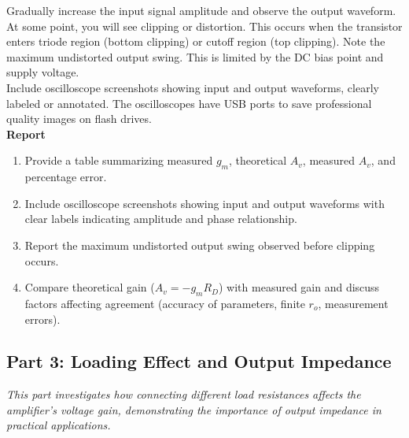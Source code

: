 \documentclass[10pt]{article}
\begin{document}
Gradually increase the input signal amplitude and observe the output waveform. At some point, you will see clipping or distortion. This occurs when the transistor enters triode region (bottom clipping) or cutoff region (top clipping). Note the maximum undistorted output swing.  This is limited by the DC bias point and supply voltage. \\


Include oscilloscope screenshots showing input and output waveforms, clearly labeled or annotated. The oscilloscopes have USB ports to save professional quality images on flash drives. \\

\textbf{Report}
\begin{enumerate}
    \item Provide a table summarizing measured $g_m$, theoretical $A_v$, measured $A_v$, and percentage error.
    \item Include oscilloscope screenshots showing input and output waveforms with clear labels indicating amplitude and phase relationship.
    \item Report the maximum undistorted output swing observed before clipping occurs.
    \item Compare theoretical gain ($A_v = -g_m R_D$) with measured gain and discuss factors affecting agreement (accuracy of parameters, finite $r_o$, measurement errors).\\
\end{enumerate}

\subsection{Part 3: Loading Effect and Output Impedance}

\textit{This part investigates how connecting different load resistances affects the amplifier's voltage gain, demonstrating the importance of output impedance in practical applications.} \\
\end{document}

